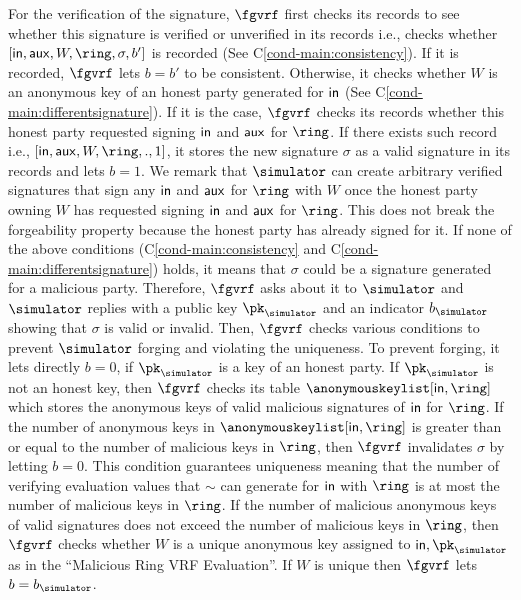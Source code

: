 For the verification of the signature, $ \fgvrf $  first checks its records to see whether this signature is verified or unverified in its records i.e., checks  whether $ [\msg,\aux,W,\ring,\sigma, b'] $ is recorded (See  C\ref{cond-main:consistency}). If it is recorded, $ \fgvrf $ lets  $ b = b' $ to be consistent. Otherwise, it checks whether $ W $ is an anonymous key of an honest party generated for $ \mathsf{in} $ (See C\ref{cond-main:differentsignature}). If it is the case, $ \fgvrf $ checks  its records whether this honest party requested signing  $ \mathsf{in} $ and $ \mathsf{aux} $ for $ \ring $.  If there exists such record i.e., $ [\msg, \aux, W, \ring, ., 1] $, it stores the new signature $ \sigma $ as a valid signature in its records and lets $ b = 1 $. We remark that $ \simulator $ can create arbitrary verified signatures that sign any $ \mathsf{in} $ and $ \mathsf{aux} $ for $ \ring $ with $ W $ once the honest party owning $ W $ has requested signing $ \mathsf{in} $ and $ \mathsf{aux} $ for $ \ring $. This does not break the forgeability property because the honest party has already signed for it. 
If none of the above conditions (C\ref{cond-main:consistency} and C\ref{cond-main:differentsignature}) holds, it means that $ \sigma $ could be a signature generated for a malicious party. Therefore, $ \fgvrf $ asks about it to $ \simulator $ and $ \simulator $ replies with  a public key $ \pk_\simulator $ and an indicator $ b_\simulator $ showing that $ \sigma  $ is valid or invalid. Then, $ \fgvrf $ checks various conditions to prevent $ \simulator $ forging and violating the uniqueness. To prevent forging, it lets  directly $ b = 0 $, if $ \pk_\simulator $ is a key of an honest party. If $ \pk_\simulator $ is not an honest key, then $ \fgvrf $ checks its table $ \anonymouskeylist[\msg,\ring] $ which stores the anonymous keys of valid malicious signatures of $ \mathsf{in} $ for $ \ring $. If the number of anonymous keys in $ \anonymouskeylist[\msg,\ring] $ is greater than or equal to the number of malicious keys in $ \ring $, then $ \fgvrf $ invalidates $ \sigma $ by letting $ b = 0 $. This condition guarantees  uniqueness meaning that the number of verifying evaluation values that $ \sim $ can generate for $ \mathsf{in} $ with $ \ring $ is at most the  number of malicious keys in $ \ring $. If the number of malicious anonymous keys of valid signatures does not exceed the number of malicious keys in $ \ring $, then $ \fgvrf $ checks whether $ W $ is a unique anonymous key assigned to $ \msg,\pk_\simulator $ as in the ``Malicious Ring VRF Evaluation''. If $ W $ is unique then $ \fgvrf $ lets $ b = b_\simulator $.

